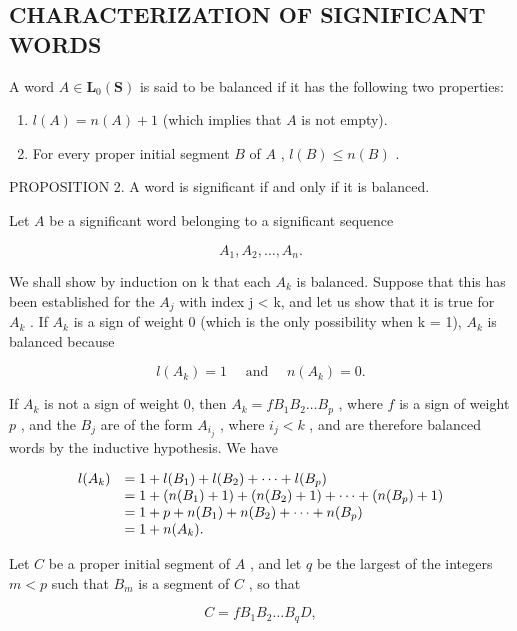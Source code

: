 \subsection{CHARACTERIZATION OF SIGNIFICANT WORDS}

A word \(A \in \mathbf{L}_0(\mathbf{S})\) is said to be balanced if it has the following two properties:

\begin{enumerate}
\def\labelenumi{(\arabic{enumi})}
\item
  \(l(A) = n(A) + 1\) (which implies that \(A\) is not empty).
\item
  For every proper initial segment \(B\) of \(A\) , \(l(B) \leqslant n(B)\) .
\end{enumerate}

PROPOSITION 2. A word is significant if and only if it is balanced.

Let \(A\) be a significant word belonging to a significant sequence

\[
A _ {1}, A _ {2}, \dots , A _ {n}.
\]

We shall show by induction on k that each \(A_{k}\) is balanced. Suppose that this has been established for the \(A_{j}\) with index j \textless{} k, and let us show that it is true for \(A_{k}\) . If \(A_{k}\) is a sign of weight 0 (which is the only possibility when k = 1), \(A_{k}\) is balanced because

\[
l (A _ {k}) = 1 \quad \text { and } \quad n (A _ {k}) = 0.
\]

If \(A_{k}\) is not a sign of weight 0, then \(A_{k} = fB_{1}B_{2}\ldots B_{p}\) , where \(f\) is a sign of weight \(p\) , and the \(B_{j}\) are of the form \(A_{i_{j}}\) , where \(i_{j} < k\) , and are therefore balanced words by the inductive hypothesis. We have

\[
\begin{array}{r l} l (A _ {k}) & = 1 + l (B _ {1}) + l (B _ {2}) + \dots + l (B _ {p}) \\ & = 1 + (n (B _ {1}) + 1) + (n (B _ {2}) + 1) + \dots + (n (B _ {p}) + 1) \\ & = 1 + p + n (B _ {1}) + n (B _ {2}) + \dots + n (B _ {p}) \\ & = 1 + n (A _ {k}). \end{array}
\]

Let \(C\) be a proper initial segment of \(A\) , and let \(q\) be the largest of the integers \(m < p\) such that \(B_{m}\) is a segment of \(C\) , so that

\[
C = f B _ {1} B _ {2} \dots B _ {q} D,
\]

